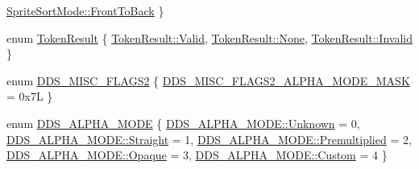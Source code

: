 \begin{DoxyCompactItemize}
\hyperlink{namespacemage_a256fa5833eecc408923de7ffadb5e014a44a4d81c96c5451956c4412d045e32ae}{Sprite\+Sort\+Mode\+::\+Front\+To\+Back}
 \}
\item 
enum \hyperlink{namespacemage_a2178ba2411db5912f41b2e7698c2037d}{Token\+Result} \{ \hyperlink{namespacemage_a2178ba2411db5912f41b2e7698c2037da3ac705f2acd51a4613f9188c05c91d0d}{Token\+Result\+::\+Valid}, 
\hyperlink{namespacemage_a2178ba2411db5912f41b2e7698c2037da6adf97f83acf6453d4a6a4b1070f3754}{Token\+Result\+::\+None}, 
\hyperlink{namespacemage_a2178ba2411db5912f41b2e7698c2037da4bbb8f967da6d1a610596d7257179c2b}{Token\+Result\+::\+Invalid}
 \}
\item 
enum \hyperlink{namespacemage_a0943eceedce2e66b3b66d0566b15c712}{D\+D\+S\+\_\+\+M\+I\+S\+C\+\_\+\+F\+L\+A\+G\+S2} \{ \hyperlink{namespacemage_a0943eceedce2e66b3b66d0566b15c712af6954b93e1e18fa5366ebb55d65ecbcf}{D\+D\+S\+\_\+\+M\+I\+S\+C\+\_\+\+F\+L\+A\+G\+S2\+\_\+\+A\+L\+P\+H\+A\+\_\+\+M\+O\+D\+E\+\_\+\+M\+A\+SK} = 0x7L
 \}
\item 
enum \hyperlink{namespacemage_a0c586a2bad862f4858900ca121ca80c2}{D\+D\+S\+\_\+\+A\+L\+P\+H\+A\+\_\+\+M\+O\+DE} \{ \newline
\hyperlink{namespacemage_a0c586a2bad862f4858900ca121ca80c2a88183b946cc5f0e8c96b2e66e1c74a7e}{D\+D\+S\+\_\+\+A\+L\+P\+H\+A\+\_\+\+M\+O\+D\+E\+::\+Unknown} = 0, 
\hyperlink{namespacemage_a0c586a2bad862f4858900ca121ca80c2ab6bd418b8879851e86bcaccd553b74db}{D\+D\+S\+\_\+\+A\+L\+P\+H\+A\+\_\+\+M\+O\+D\+E\+::\+Straight} = 1, 
\hyperlink{namespacemage_a0c586a2bad862f4858900ca121ca80c2a39a960b9c0fdfe58f8963d9ee2399459}{D\+D\+S\+\_\+\+A\+L\+P\+H\+A\+\_\+\+M\+O\+D\+E\+::\+Premultiplied} = 2, 
\hyperlink{namespacemage_a0c586a2bad862f4858900ca121ca80c2afaa90538de35640e4b1e31ccf35b6eb5}{D\+D\+S\+\_\+\+A\+L\+P\+H\+A\+\_\+\+M\+O\+D\+E\+::\+Opaque} = 3, 
\newline
\hyperlink{namespacemage_a0c586a2bad862f4858900ca121ca80c2a90589c47f06eb971d548591f23c285af}{D\+D\+S\+\_\+\+A\+L\+P\+H\+A\+\_\+\+M\+O\+D\+E\+::\+Custom} = 4
 \}
\end{DoxyCompactItemize}
